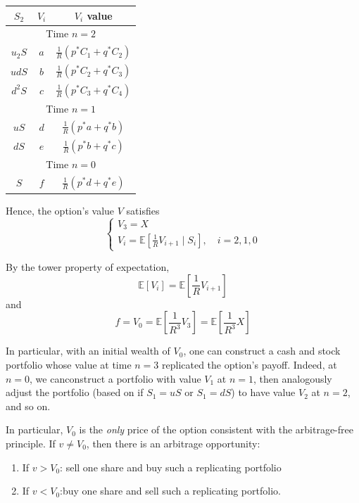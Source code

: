 \documentclass[12pt]{report}
\newcommand{\E}{\mathbb{E}}
\begin{document}
    \begin{center}
        \begin{tabular}{ccc}
            $S_2$ & $V_i$ & $V_i$ value\\ 
            \hline \hline
            \multicolumn{3}{c}{Time $n=2$}\\ 
            $u_2S$ & $a$ & $\frac{1}{R}(p^* C_1 + q^* C_2)$\\
            $udS$ & $b$ & $\frac{1}{R}(p^* C_2 + q^* C_3)$\\
            $d^2S$ & $c$ & $\frac{1}{R}(p^* C_3 + q^* C_4)$\\
            \multicolumn{3}{c}{Time $n=1$}\\ 
            $uS$ & $d$ & $\frac{1}{R}(p^* a + q^* b)$\\
            $dS$ & $e$ & $\frac{1}{R}(p^* b + q^* c)$\\
            \multicolumn{3}{c}{Time $n=0$}\\
            $S$ & $f$ & $\frac{1}{R}(p^* d + q^* e)$
        \end{tabular}
    \end{center}

    Hence, the option's value $V$ satisfies 
    \[\begin{cases}
        V_3 = X\\ 
        V_i = \E[\frac{1}{R} V_{i+1} \; | \; S_i], \quad i = 2, 1, 0
    \end{cases}\]

    By the tower property of expectation, 
    \[\E[V_i] = \E[\frac{1}{R} V_{i+1}]\]
    and
    \[f = V_0 = \E[\frac{1}{R^3} V_3] = \E[\frac{1}{R^3} X]\]

    In particular, with an initial wealth of $V_0$, one can construct a cash and stock portfolio whose value at time $n = 3$ replicated the option's payoff. Indeed, at $n=0$, we canconstruct a portfolio with value $V_1$ at $n = 1$, then analogously adjust the portfolio (based on if $S_1 = uS$ or $S_1 = dS$) to have value $V_2$ at $n = 2$, and so on.

    In particular, $V_0$ is the \emph{only} price of the option consistent with the arbitrage-free principle. If $v \neq V_0$, then there is an arbitrage opportunity: 
    \begin{enumerate}
        \item If $v > V_0$: sell one share and buy such a replicating portfolio 
        \item If $v < V_0$:buy one share and sell such a replicating portfolio. 
    \end{enumerate}
\end{document}
